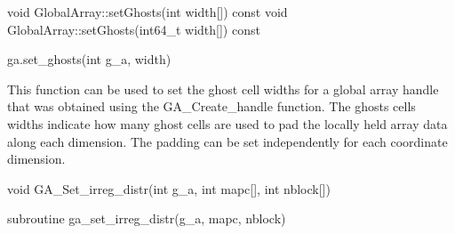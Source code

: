 \documentclass[12pt]{article}
\begin{document}
\begin{cxxapi}
\begin{cxxcode}
void GlobalArray::setGhosts(int width[]) const
void GlobalArray::setGhosts(int64_t width[]) const
\end{cxxcode}
\begin{funcargs}
\end{funcargs}
\end{cxxapi}

\begin{pyapi}
\begin{pycode}
ga.set_ghosts(int g_a, width)
\end{pycode}
\begin{funcargs}
\end{funcargs}
\end{pyapi}

\gcoll

\begin{desc}

This function can be used to set the ghost cell widths for a global array
handle that was obtained using the GA_Create_handle function.  The ghosts cells
widths indicate how many ghost cells are used to pad the locally held array
data along each dimension. The padding can be set independently for each
coordinate dimension.

\end{desc}


\begin{capi}
\begin{ccode}
void GA_Set_irreg_distr(int g_a, int mapc[], int nblock[])
\end{ccode}
\begin{funcargs}
\end{funcargs}
\end{capi}

\begin{fapi}
\begin{fcode}
subroutine ga_set_irreg_distr(g_a, mapc, nblock)
\end{fcode}
\begin{funcargs}
\end{funcargs}
\end{fapi}
\end{document}
